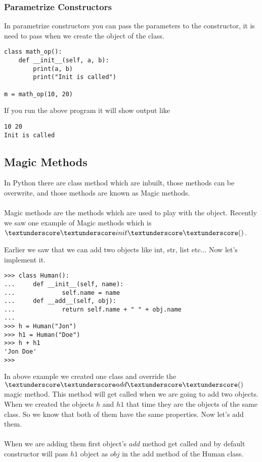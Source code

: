 \documentclass[letterpaper,12pt]{book}
\begin{document}
\subsubsection{Parametrize Constructors}
In parametrize constructors you can pass the parameters to the constructor, it is need to pass when we create the object of the class.

\begin{lstlisting}
class math_op():
    def __init__(self, a, b):
        print(a, b)
        print("Init is called")
		
m = math_op(10, 20)
\end{lstlisting}
If you run the above program it will show output like
\begin{lstlisting}
10 20
Init is called
\end{lstlisting}
\subsection{Magic Methods}
In Python there are class method which are inbuilt, those methods can be overwrite, and those methods are known as Magic methods.
\paragraph{}
Magic methods are the methods which are used to play with the object. Recently we saw one example of Magic methods which is $\textunderscore\textunderscore init \textunderscore\textunderscore()$.

Earlier we saw that we can add two objects like int, str, list etc... Now let's implement it. 
\begin{lstlisting}
>>> class Human():
...     def __init__(self, name):
...             self.name = name
...     def __add__(self, obj):
...             return self.name + " " + obj.name
... 
>>> h = Human("Jon")
>>> h1 = Human("Doe")
>>> h + h1
'Jon Doe'
>>> 
\end{lstlisting} 
In above example we created one class and override the $\textunderscore\textunderscore add \textunderscore\textunderscore()$ magic method. This method will get called when we are going to add two objects. When we created the objects $h$ and $h1$ that time they are the objects of the same class. So we know that both of them have the same properties. Now let's add them. 

\paragraph{}
When we are adding them first object's $add$ method get called and by default constructor will pass $h1$ object as $obj$ in the add method of the Human class.
\end{document}
